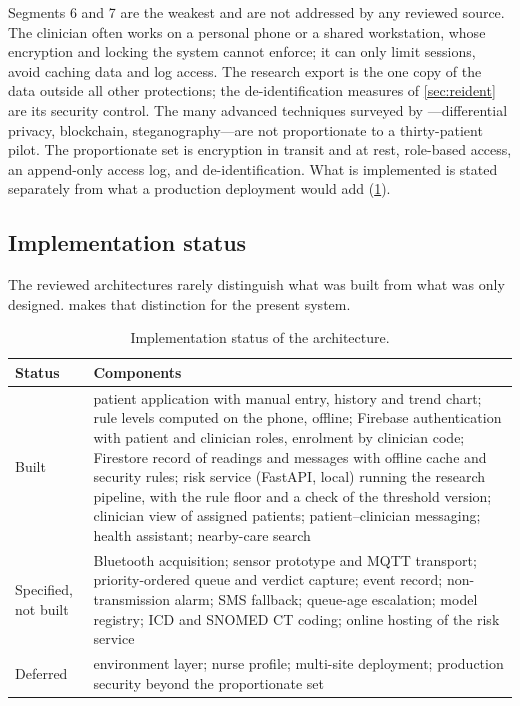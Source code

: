 Segments 6 and 7 are the weakest and are not addressed by any reviewed source. The clinician often works on a personal phone or a shared workstation, whose encryption and locking the system cannot enforce; it can only limit sessions, avoid caching data and log access. The research export is the one copy of the data outside all other protections; the de-identification measures of \cref{sec:reident} are its security control. The many advanced techniques surveyed by \textcite{liu2025review}---differential privacy, blockchain, steganography---are not proportionate to a thirty-patient pilot. The proportionate set is encryption in transit and at rest, role-based access, an append-only access log, and de-identification. What is implemented is stated separately from what a production deployment would add (\cref{tab:build-status}).

\subsection{Implementation status}\label{sec:built-specified}

The reviewed architectures rarely distinguish what was built from what was only designed.  makes that distinction for the present system.

\begin{table}[htbp]
\centering\footnotesize
\caption{Implementation status of the architecture.}\label{tab:build-status}
\begin{tabularx}{\textwidth}{@{}>{\raggedright\arraybackslash}p{3.0cm} X@{}}
\toprule
\textbf{Status} & \textbf{Components} \\
\midrule
Built & patient application with manual entry, history and trend chart; rule levels computed on the phone, offline; Firebase authentication with patient and clinician roles, enrolment by clinician code; Firestore record of readings and messages with offline cache and security rules; risk service (FastAPI, local) running the research pipeline, with the rule floor and a check of the threshold version; clinician view of assigned patients; patient--clinician messaging; health assistant; nearby-care search \\
Specified, not built & Bluetooth acquisition; sensor prototype and MQTT transport; priority-ordered queue and verdict capture; event record; non-transmission alarm; SMS fallback; queue-age escalation; model registry; ICD and SNOMED CT coding; online hosting of the risk service \\
Deferred & environment layer; nurse profile; multi-site deployment; production security beyond the proportionate set \\
\bottomrule
\end{tabularx}
\end{table}

